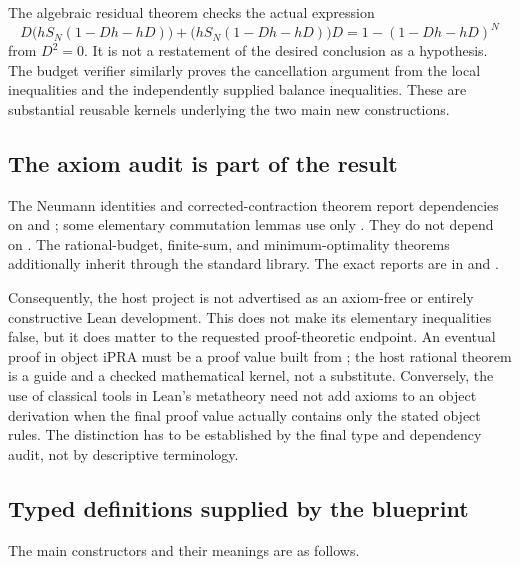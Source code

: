 The algebraic residual theorem checks the actual expression
\[
 D\bigl(hS_N(1-Dh-hD)\bigr)
 +\bigl(hS_N(1-Dh-hD)\bigr)D
 =1-(1-Dh-hD)^N
\]
from $D^2=0$. It is not a restatement of the desired conclusion as a hypothesis. The budget verifier similarly proves the cancellation argument from the local inequalities and the independently supplied balance inequalities. These are substantial reusable kernels underlying the two main new constructions.

\subsection{The axiom audit is part of the result}

The Neumann identities and corrected-contraction theorem report dependencies on  and ; some elementary commutation lemmas use only . They do not depend on . The rational-budget, finite-sum, and minimum-optimality theorems additionally inherit  through the standard  library. The exact reports are in  and .

Consequently, the host project is not advertised as an axiom-free or entirely constructive Lean development. This does not make its elementary inequalities false, but it does matter to the requested proof-theoretic endpoint. An eventual proof in object iPRA must be a proof value built from ; the host rational theorem is a guide and a checked mathematical kernel, not a substitute. Conversely, the use of classical tools in Lean's metatheory need not add axioms to an object derivation when the final proof value actually contains only the stated object rules. The distinction has to be established by the final type and dependency audit, not by descriptive terminology.

\subsection{Typed definitions supplied by the blueprint}

The main constructors and their meanings are as follows.

